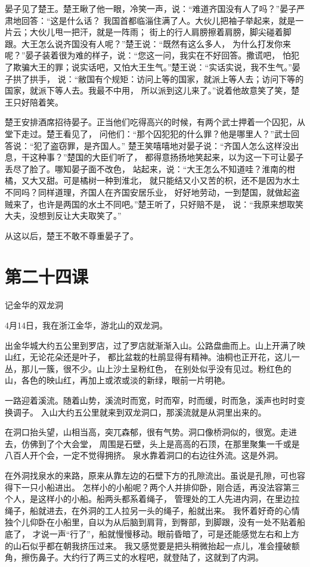 \documentclass[12pt,UTF8]{ctexbook}
\begin{document}
晏子见了楚王。楚王瞅了他一眼，冷笑一声，说：“难道齐国没有人了吗？”晏子严肃地回答：“这是什么话？
我国首都临淄住满了人。大伙儿把袖子举起来，就是一片云；大伙儿甩一把汗，就是一阵雨；
街上的行人肩膀擦着肩膀，脚尖碰着脚跟。大王怎么说齐国没有人呢？”楚王说：“既然有这么多人，
为什么打发你来呢？”晏子装着很为难的样子，说：“您这一问，我实在不好回答。撒谎吧，
怕犯了欺骗大王的罪；说实话吧，又怕大王生气。”楚王说：“实话实说，我不生气。”晏子拱了拱手，
说：“敝国有个规矩：访问上等的国家，就派上等人去；访问下等的国家，就派下等人去。我最不中用，
所以派到这儿来了。”说着他故意笑了笑，楚王只好陪着笑。

楚王安排酒席招待晏子。正当他们吃得高兴的时候，有两个武士押着一个囚犯，从堂下走过。楚王看见了，
问他们：“那个囚犯犯的什么罪？他是哪里人？”武士回答说：“犯了盗窃罪，是齐国人。”
楚王笑嘻嘻地对晏子说：“齐国人怎么这样没出息，干这种事？”楚国的大臣们听了，
都得意扬扬地笑起来，以为这一下可让晏子丢尽了脸了。哪知晏子面不改色，
站起来，说：“大王怎么不知道哇？淮南的柑橘，又大又甜。可是橘树一种到淮北，
就只能结又小又苦的枳，还不是因为水土不同吗？同样道理，齐国人在齐国安居乐业，
好好地劳动，一到楚国，就做起盗贼来了，也许是两国的水土不同吧。”楚王听了，只好赔不是，
说：“我原来想取笑大夫，没想到反让大夫取笑了。”

从这以后，楚王不敢不尊重晏子了。

\section{第二十四课}

记金华的双龙洞

4月14日，我在浙江金华，游北山的双龙洞。

出金华城大约五公里到罗店，过了罗店就渐渐入山。公路盘曲而上。山上开满了映山红，无论花朵还是叶子，
都比盆栽的杜鹃显得有精神。油桐也正开花，这儿一丛，那儿一簇，很不少。山上沙土呈粉红色，
在别处似乎没有见过。粉红色的山，各色的映山红，再加上或浓或淡的新绿，眼前一片明艳。

一路迎着溪流。随着山势，溪流时而宽，时而窄，时而缓，时而急，溪声也时时变换调子。
入山大约五公里就来到双龙洞口，那溪流就是从洞里出来的。

在洞口抬头望，山相当高，突兀森郁，很有气势。洞口像桥洞似的，很宽。走进去，仿佛到了个大会堂，
周围是石壁，头上是高高的石顶，在那里聚集一千或是八百人开个会，一定不觉得拥挤。
泉水靠着洞口的右边往外流。这是外洞。

在外洞找泉水的来路，原来从靠左边的石壁下方的孔隙流出。虽说是孔隙，可也容得下一只小船进出。
怎样小的小船呢？两个人并排仰卧，刚合适，再没法容第三个人，是这样小的小船。船两头都系着绳子，
管理处的工人先进内洞，在里边拉绳子，船就进去，在外洞的工人拉另一头的绳子，船就出来。
我怀着好奇的心情独个儿仰卧在小船里，自以为从后脑到肩背，到臀部，到脚跟，没有一处不贴着船底了，
才说一声“行了”，船就慢慢移动。眼前昏暗了，可是还能感觉左右和上方的山石似乎都在朝我挤压过来。
我又感觉要是把头稍微抬起一点儿，准会撞破额角，擦伤鼻子。大约行了两三丈的水程吧，就登陆了，这就到了内洞。
\end{document}
